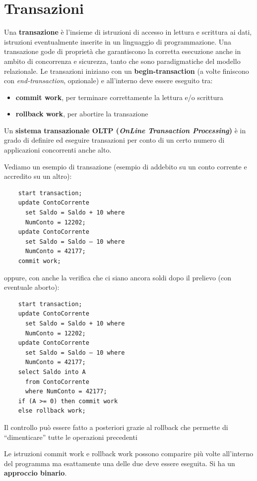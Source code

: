 \documentclass[a4paper,12pt, oneside]{book}
\begin{document}
\section{Transazioni}
Una \textbf{transazione} è l'insieme di istruzioni di accesso in lettura e
scrittura ai dati, istruzioni eventualmente inserite in un linguaggio di
programmazione. Una transazione gode di proprietà che garantiscono la corretta
esecuzione anche in ambito di concorrenza e sicurezza, tanto che sono
paradigmatiche del modello relazionale. Le transazioni iniziano con un
\textbf{begin-transaction} (a volte finiscono con \textit{end-transaction},
opzionale) e all'interno deve essere eseguito tra:
\begin{itemize}
  \item \textbf{commit work}, per terminare correttamente la lettura e/o
  scrittura 
  \item \textbf{rollback work}, per abortire la transazione
\end{itemize}
Un \textbf{sistema transazionale OLTP (\textit{OnLine Transaction Processing})}
è in grado di definire ed eseguire transazioni per conto di un certo numero di
applicazioni concorrenti anche alto. 
\begin{esempio}
  Vediamo un esempio di transazione (esempio di addebito su un conto corrente e
  accredito su un altro):
  \begin{verbatim}
    start transaction;
    update ContoCorrente
      set Saldo = Saldo + 10 where
      NumConto = 12202;
    update ContoCorrente
      set Saldo = Saldo – 10 where
      NumConto = 42177;
    commit work;
  \end{verbatim}
  oppure, con anche la verifica che ci siano ancora soldi dopo il prelievo (con
  eventuale aborto):
  \begin{verbatim}
    start transaction;
    update ContoCorrente
      set Saldo = Saldo + 10 where
      NumConto = 12202;
    update ContoCorrente
      set Saldo = Saldo – 10 where
      NumConto = 42177;
    select Saldo into A
      from ContoCorrente
      where NumConto = 42177;
    if (A >= 0) then commit work
    else rollback work;
  \end{verbatim}
  Il controllo può essere fatto a posteriori grazie al rollback che permette di
  ``dimenticare'' tutte le operazioni precedenti
\end{esempio}
Le istruzioni commit work e rollback work possono comparire più volte
all'interno del programma ma esattamente una delle due deve essere eseguita. Si
ha un \textbf{approccio binario}.\\
\end{document}
